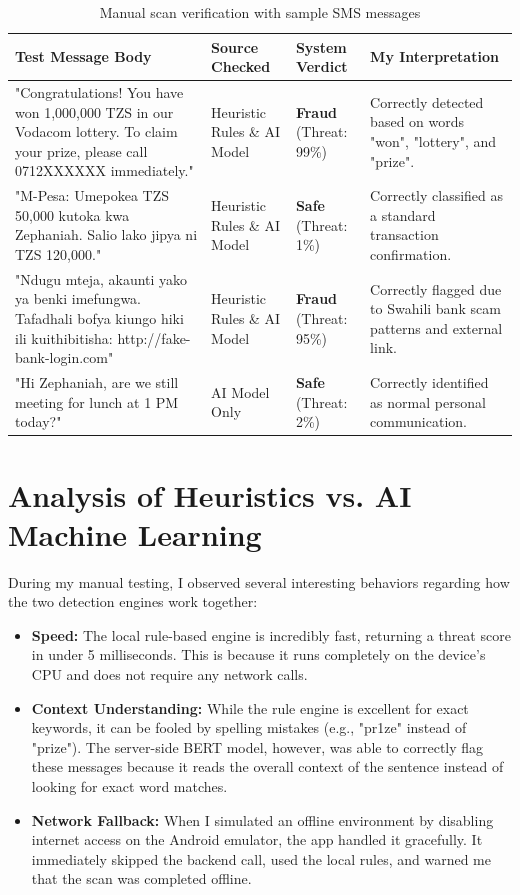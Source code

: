 \begin{table}[htbp]
  \centering
  \caption{Manual scan verification with sample SMS messages}
  \label{tab:example-predictions}
  \begin{tabularx}{\textwidth}{X p{} p{} p{}}
    \toprule
    \textbf{Test Message Body} & \textbf{Source Checked} & \textbf{System Verdict} & \textbf{My Interpretation}\\
    \midrule
    "Congratulations! You have won 1,000,000 TZS in our Vodacom lottery. To claim your prize, please call 0712XXXXXX immediately." & Heuristic Rules \& AI Model & \textbf{Fraud} (Threat: 99\%) & Correctly detected based on words "won", "lottery", and "prize".\\
    "M-Pesa: Umepokea TZS 50,000 kutoka kwa Zephaniah. Salio lako jipya ni TZS 120,000." & Heuristic Rules \& AI Model & \textbf{Safe} (Threat: 1\%) & Correctly classified as a standard transaction confirmation.\\
    "Ndugu mteja, akaunti yako ya benki imefungwa. Tafadhali bofya kiungo hiki ili kuithibitisha: http://fake-bank-login.com" & Heuristic Rules \& AI Model & \textbf{Fraud} (Threat: 95\%) & Correctly flagged due to Swahili bank scam patterns and external link.\\
    "Hi Zephaniah, are we still meeting for lunch at 1 PM today?" & AI Model Only & \textbf{Safe} (Threat: 2\%) & Correctly identified as normal personal communication.\\
    \bottomrule
  \end{tabularx}
\end{table}

\section{Analysis of Heuristics vs. AI Machine Learning}
During my manual testing, I observed several interesting behaviors regarding how the two detection engines work together:
\begin{itemize}
  \item \textbf{Speed:} The local rule-based engine is incredibly fast, returning a threat score in under 5 milliseconds. This is because it runs completely on the device's CPU and does not require any network calls.
  \item \textbf{Context Understanding:} While the rule engine is excellent for exact keywords, it can be fooled by spelling mistakes (e.g., "pr1ze" instead of "prize"). The server-side BERT model, however, was able to correctly flag these messages because it reads the overall context of the sentence instead of looking for exact word matches.
  \item \textbf{Network Fallback:} When I simulated an offline environment by disabling internet access on the Android emulator, the app handled it gracefully. It immediately skipped the backend call, used the local rules, and warned me that the scan was completed offline.
\end{itemize}

